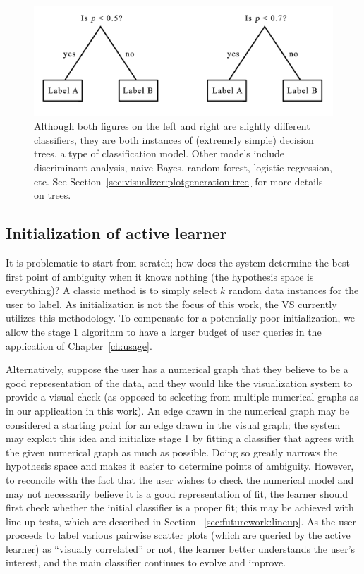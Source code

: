 \begin{figure}[htb]
	\begin{center}
		\includegraphics[width=0.75\linewidth]{ch-visualizer/figures/tree}
		\caption[Classifiers and classification models]{Although both figures 
		on the left and right are slightly different classifiers, they 
		are both instances of (extremely simple) decision trees, a type of 
		classification model. Other models include discriminant analysis, naive 
		Bayes, random forest, logistic regression, etc. 
		See Section~\ref{sec:visualizer:plotgeneration:tree} for more details 
		on trees.}
		\label{fig:visualizer:al:tree}
	\end{center}
\end{figure}

\subsection{Initialization of active learner}
\label{sec:visualizer:al:initialization}

It is problematic to start from scratch; how does the system determine
the best first point of ambiguity when it knows nothing (the hypothesis space is
everything)? A classic method is to simply select $k$ random data instances for 
the user to label. As initialization is not the focus of this work, the VS 
currently utilizes this methodology. To compensate for a potentially poor 
initialization, we allow the stage 1 algorithm to have a larger budget of user 
queries in the application of Chapter~\ref{ch:usage}.

Alternatively, suppose the user has a numerical graph that they believe to be a 
good representation of the data, and they would like the visualization system to
provide a visual check (as opposed to selecting from multiple numerical graphs 
as in our application in this work). An edge drawn in the numerical graph may 
be considered a starting point for an edge drawn in the visual graph; the 
system may exploit this idea and initialize stage 1 by fitting a classifier 
that agrees with the given numerical graph as much as possible. 
Doing so greatly narrows the hypothesis space and makes it easier
to determine points of ambiguity. However, to reconcile with the fact that the
user wishes to check the numerical model and may not necessarily believe it is a
good representation of fit, the learner should first check whether the initial 
classifier is a proper fit; this may be achieved with line-up tests, which are 
described in Section ~\ref{sec:futurework:lineup}. As the user proceeds to 
label various pairwise scatter plots (which are queried by the active learner) 
as ``visually correlated'' or not, the learner better understands the
user’s interest, and the main classifier continues to evolve and improve.

